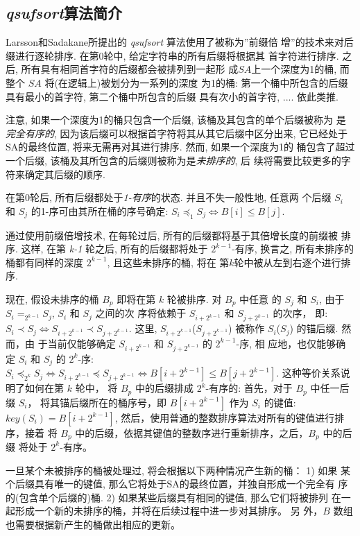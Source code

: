 \documentclass{ws-ijprai}
\begin{document}
\subsection{ \emph{qsufsort}算法简介}
\label{sec:qsufsort}

Larsson和Sadakane所提出的 \emph{qsufsort} 算法使用了被称为''前缀倍
增''的技术来对后缀进行逐轮排序. 在第0轮中, 给定字符串的所有后缀将根据其
首字符进行排序. 之后, 所有具有相同首字符的后缀都会被排列到一起形
成$SA$上一个深度为1的桶, 而整个 $SA$ 将(在逻辑上)被划分为一系列的深度
为1的桶: 第一个桶中所包含的后缀具有最小的首字符, 第二个桶中所包含的后缀
具有次小的首字符, .... 依此类推.

注意, 如果一个深度为1的桶只包含一个后缀, 该桶及其包含的单个后缀被称为
是\emph{完全有序的}, 因为该后缀可以根据首字符将其从其它后缀中区分出来,
它已经处于SA的最终位置, 将来无需再对其进行排序. 然而, 如果一个深度为1的
桶包含了超过一个后缀, 该桶及其所包含的后缀则被称为是\emph{未排序的}, 后
续将需要比较更多的字符来确定其后缀的顺序.

在第0轮后, 所有后缀都处于\emph{1-有序}的状态. 并且不失一般性地, 任意两
个后缀 $S_i$ 和 $S_j$ 的1-序可由其所在桶的序号确定:
$S_i \preceq_1 S_j \iff B[i] \leq B[j]$.

通过使用前缀倍增技术, 在每轮过后, 所有的后缀都将基于其倍增长度的前缀被
排序. 这样, 在第 \emph{k-1} 轮之后, 所有的后缀都将处于 $2^{k-1}$-有序,
换言之, 所有未排序的桶都有同样的深度 $2^{k-1}$, 且这些未排序的桶, 将在
第$k$轮中被从左到右逐个进行排序.

现在, 假设未排序的桶 $B_p$ 即将在第 $k$ 轮被排序. 对 $B_p$ 中任意
的 $S_j$ 和 $S_i$, 由于 $S_i =_{2^{k-1}} S_j$, $S_i$ 和 $S_j$ 之间的次
序将依赖于 $S_{i+2^{k-1}}$ 和 $S_{j+2^{k-1}}$ 的次序， 即:
$S_i \prec S_j \iff S_{i+2^{k-1}} \prec S_{j+2^{k-1}}$. 这里,
$S_{i+2^{k-1}}$($S_{j+2^{k-1}}$) 被称作 $S_i$($S_j$) 的锚后缀. 然而，由
于当前仅能够确定 $S_{i+2^{k-1}}$ 和 $S_{j+2^{k-1}}$ 的 $2^{k-1}$-序, 相
应地，也仅能够确定 $S_i$ 和 $S_j$ 的 $2^k$-序:
$S_i \preceq_{2^k} S_j \iff S_{i+2^{k-1}} \preceq S_{j+2^{k-1}} \iff
B[i+2^{k-1}] \leq B[j+2^{k-1}]$.  这种等价关系说明了如何在第 $k$ 轮中，
将 $B_p$ 中的后缀排成 $2^k$-有序的: 首先，对于 $B_p$ 中任一后缀 $S_i$，
将其锚后缀所在的桶序号，即 $B[i+2^{k-1}]$ 作为 $S_i$ 的键值: $key(S_i)
= B[i+2^{k-1}]$, 然后，使用普通的整数排序算法对所有的键值进行排序，接着
将 $B_p$ 中的后缀，依据其键值的整数序进行重新排序，之后，$B_p$ 中的后缀
将处于 $2^k$-有序。

一旦某个未被排序的桶被处理过, 将会根据以下两种情况产生新的桶： 1) 如果
某个后缀具有唯一的键值, 那么它将处于SA的最终位置，并独自形成一个完全有
序的(包含单个后缀的)桶. 2) 如果某些后缀具有相同的键值, 那么它们将被排列
在一起形成一个新的未排序的桶，并将在后续过程中进一步对其排序。 另
外，$B$ 数组也需要根据新产生的桶做出相应的更新。
\end{document}
